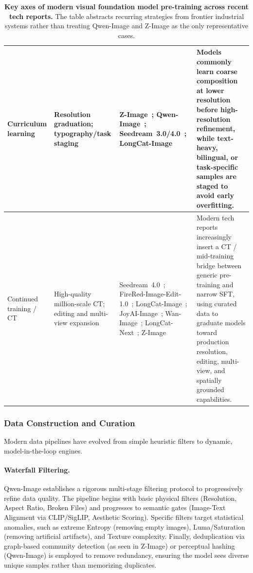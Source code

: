 \documentclass{llmxive}
\begin{document}
\begin{table}[t]
\begin{tabularx}{\textwidth}{@{}>{\arraybackslash}p{2.6cm}>{\arraybackslash}p{3.0cm}>{\arraybackslash}p{4.6cm}>{\arraybackslash}X@{}}
\midrule
Curriculum learning & Resolution graduation; typography/task staging & Z-Image~\citep{cai2025z}; Qwen-Image~\citep{wu2025qwen}; Seedream~3.0/4.0~\citep{gao2025seedream,seedream2025seedream}; LongCat-Image~\citep{team2025longcat} & Models commonly learn coarse composition at lower resolution before high-resolution refinement, while text-heavy, bilingual, or task-specific samples are staged to avoid early overfitting. \\
\midrule
Continued training / CT & High-quality million-scale CT; editing and multi-view expansion & Seedream~4.0~\citep{seedream2025seedream}; FireRed-Image-Edit-1.0~\citep{team2026firered}; LongCat-Image~\citep{team2025longcat}; JoyAI-Image~\citep{jdjoyaiimage}; Wan-Image~\citep{mao2026wan}; LongCat-Next~\citep{team2026longcat}; Z-Image~\citep{cai2025z} & Modern tech reports increasingly insert a CT / mid-training bridge between generic pre-training and narrow SFT, using curated data to graduate models toward production resolution, editing, multi-view, and spatially grounded capabilities. \\
\bottomrule
\end{tabularx}
\caption{\textbf{Key axes of modern visual foundation model pre-training across recent tech reports.} The table abstracts recurring strategies from frontier industrial systems rather than treating Qwen-Image and Z-Image as the only representative cases.}
\label{tab:pretrain_summary}
\end{table}

\subsubsection{Data Construction and Curation}
Modern data pipelines have evolved from simple heuristic filters to dynamic, model-in-the-loop engines.

\paragraph{Waterfall Filtering.}
Qwen-Image establishes a rigorous multi-stage filtering protocol to progressively refine data quality. The pipeline begins with basic physical filters (Resolution, Aspect Ratio, Broken Files) and progresses to semantic gates (Image-Text Alignment via CLIP/SigLIP, Aesthetic Scoring). Specific filters target statistical anomalies, such as extreme Entropy (removing empty images), Luma/Saturation (removing artificial artifacts), and Texture complexity. Finally, deduplication via graph-based community detection (as seen in Z-Image) or perceptual hashing (Qwen-Image) is employed to remove redundancy, ensuring the model sees diverse unique samples rather than memorizing duplicates.
\end{document}
